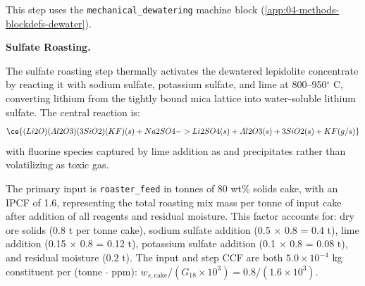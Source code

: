 This step uses the \texttt{mechanical\_dewatering} machine block (\ref{app:04-methods-blockdefs-dewater}).

\medskip
\noindent\textbf{Sulfate Roasting.}\quad

The sulfate roasting step thermally activates the dewatered lepidolite concentrate by reacting it with sodium sulfate, potassium sulfate, and lime at 800--950$^\circ$
C, converting lithium from the tightly bound mica lattice into water-soluble lithium sulfate. The central reaction is:
\begin{equation}
	\ce{(Li2O)(Al2O3)(3SiO2)(KF)(s) + Na2SO4 -> Li2SO4 (s) + Al2O3 (s) + 3SiO2 (s) + KF (g/s)}
\end{equation}
\alteqend
with fluorine species captured by lime addition as  and  precipitates rather than volatilizing as toxic  gas.

The primary input is \texttt{roaster\_feed} in tonnes of 80 wt\% solids cake, with an IPCF of 1.6, representing the total roasting mix mass per tonne of input cake after addition of all reagents and residual moisture. This factor accounts for: dry ore solids (0.8 t per tonne cake), sodium sulfate addition (0.5 $\times$ 0.8 = 0.4 t), lime addition (0.15 $\times$ 0.8 = 0.12 t), potassium sulfate addition (0.1 $\times$ 0.8 = 0.08 t), and residual moisture (0.2 t). The input and step CCF are both $5.0 \times 10^{-4}$ kg constituent per (tonne $\cdot$ ppm): $w_{s,\text{cake}} / (G_{18} \times 10^3) = 0.8 / (1.6 \times 10^3)$.

